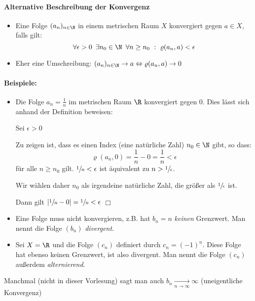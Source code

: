 \paragraph{Alternative Beschreibung der Konvergenz}
\begin{itemize}
	\item Eine Folge $(a_n)_{n\in\N}$ in einem metrischen Raum $X$ konvergiert gegen $a\in X$, falls gilt:
	\begin{equation*}
		\forall\epsilon>0\enspace \exists n_0\in\N\enspace \forall n\geq n_0 \ :\ \varrho(a_n,a)<\epsilon
	\end{equation*}
	\item Eher eine Umschreibung: $(a_n)_{n\in\N} \rightarrow a \Leftrightarrow \varrho(a_n,a)\rightarrow 0$
\end{itemize}

\paragraph{Beispiele:}
\begin{itemize}
	\item Die Folge $a_n=\frac 1 n$ im metrischen Raum $\R$ konvergiert gegen $0$. Dies lässt sich anhand der Definition beweisen:

	Sei $\epsilon>0$

	Zu zeigen ist, dass es einen Index (eine natürliche Zahl) $n_0\in\N$ gibt, so dass:
	\begin{equation*}
		\varrho(a_n,0)=\frac 1 n - 0=\frac 1 n <\epsilon
	\end{equation*}
	für alle $n\geq n_0$ gilt. $\sfrac 1 n<\epsilon$ ist äquivalent zu $n>\sfrac 1 \epsilon$.

	Wir wählen daher $n_0$ als irgendeine natürliche Zahl, die größer als $\sfrac 1 \epsilon$ ist.

	Dann gilt $|\sfrac 1 n-0|=\sfrac 1 n<\epsilon$ \hfill $\Box$

	\item Eine Folge muss nicht konvergieren, z.B. hat $b_n=n$ \emph{keinen} Grenzwert. Man nennt die Folge $(b_n)$ \emph{divergent}.

	\item Sei $X=\R$ und die Folge $(c_n)$ definiert durch $c_n=(-1)^n$. Diese Folge hat ebenso keinen Grenzwert, ist also divergent. Man nennt die Folge $(c_n)$ außerdem \emph{alternierend}.
\end{itemize}


Manchmal (nicht in dieser Vorlesung) sagt man auch $b_n\underset{n\rightarrow \infty}{\longrightarrow}\infty$ (uneigentliche Konvergenz)

